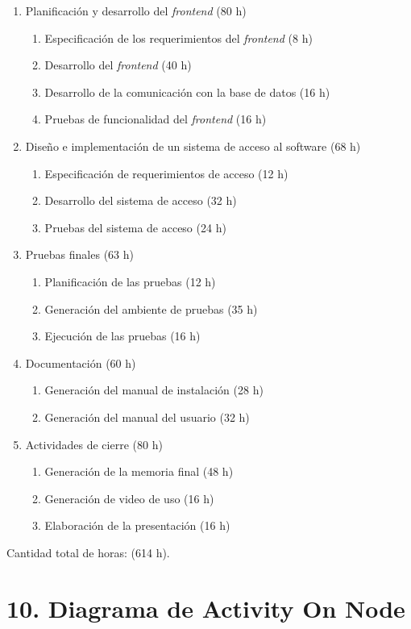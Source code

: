 \documentclass[
11pt, %
]{charter}
\begin{document}
\begin{enumerate}
\begin{enumerate}
	\end{enumerate}
\item Planificación y desarrollo del \textit{frontend} (80 h)
	\begin{enumerate}
	\item Especificación de los requerimientos del \textit{frontend} (8 h)
	\item Desarrollo del \textit{frontend} (40 h)
	\item Desarrollo de la comunicación con la base de datos (16 h)
	\item Pruebas de funcionalidad del \textit{frontend} (16 h) 
	\end{enumerate}
\item Diseño e implementación de un sistema de acceso al software (68 h)
	\begin{enumerate}
	\item Especificación de requerimientos de acceso (12 h)
	\item Desarrollo del sistema de acceso (32 h)
	\item Pruebas del sistema de acceso (24 h) 
	\end{enumerate}		
\item Pruebas finales (63 h)
	\begin{enumerate}
	\item Planificación de las pruebas (12 h) 
	\item Generación del ambiente de pruebas (35 h)
	\item Ejecución de las pruebas (16 h)
	\end{enumerate}
\item Documentación (60 h)
	\begin{enumerate}
	\item Generación del manual de instalación (28 h)
	\item Generación del manual del usuario (32 h)
	\end{enumerate}
\item Actividades de cierre (80 h)
	\begin{enumerate}
	\item Generación de la memoria final (48 h)
	\item Generación de video de uso (16 h)
	\item Elaboración de la presentación (16 h) 
	\end{enumerate}
\end{enumerate}

Cantidad total de horas: (614 h).

\section{10. Diagrama de Activity On Node}
\label{sec:AoN}
\end{document}
